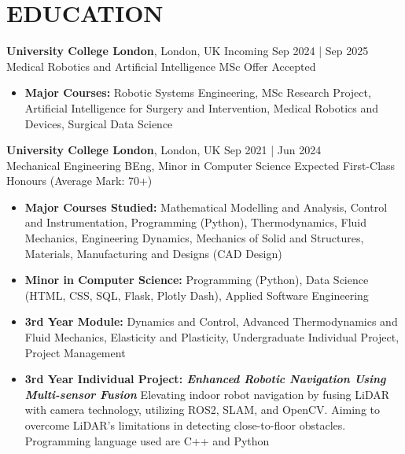 \documentclass[a4paper,9pt]{extarticle}
\begin{document}
\section*{EDUCATION}
\noindent
\textbf{University College London}, London, UK \hfill  Incoming Sep 2024 |  Sep 2025\\ 
Medical Robotics and Artificial Intelligence MSc \hfill Offer Accepted
\begin{itemize}
    \item \textbf{Major Courses:}  Robotic Systems Engineering, MSc Research Project, Artificial Intelligence for Surgery and Intervention, Medical Robotics and Devices, Surgical Data Science
\end{itemize}

\noindent
\textbf{University College London}, London, UK \hfill  Sep 2021 |  Jun 2024\\ %
Mechanical Engineering BEng, Minor in Computer Science \hfill Expected First-Class Honours (Average Mark: 70+) %
\begin{itemize}
    \item \textbf{Major Courses Studied:}  Mathematical Modelling and Analysis, Control and Instrumentation, Programming (Python), Thermodynamics, Fluid Mechanics, Engineering Dynamics, Mechanics of Solid and Structures, Materials, Manufacturing and Designs (CAD Design) 
    \item \textbf{Minor in Computer Science:} Programming (Python), Data Science (HTML, CSS, SQL, Flask, Plotly Dash), Applied Software Engineering
    \item \textbf{3rd Year Module:} Dynamics and Control, Advanced Thermodynamics and Fluid Mechanics, Elasticity and Plasticity, Undergraduate Individual Project, Project Management
    \item \textbf{3rd Year Individual Project: \textit{Enhanced Robotic Navigation Using Multi-sensor Fusion}} Elevating indoor robot navigation by fusing LiDAR with camera technology, utilizing ROS2, SLAM, and OpenCV. Aiming to overcome LiDAR's limitations in detecting close-to-floor obstacles. Programming language used are C++ and Python
\end{itemize}



\end{document}
